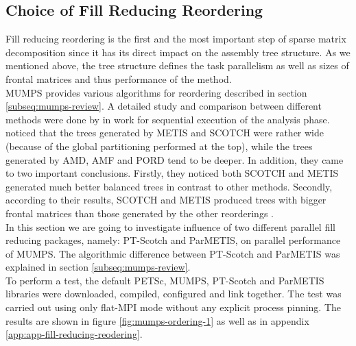 \subsection{Choice of Fill Reducing Reordering}
\label{subseq:fill-in-reordering}

Fill reducing reordering is the first and the most important step of sparse matrix decomposition since it has its direct impact on the assembly tree structure. As we mentioned above, the tree structure defines the task parallelism as well as sizes of frontal matrices and thus performance of the method.\\


MUMPS provides various algorithms for reordering described in section \ref{subseq:mumps-review}. A detailed study and comparison between different methods were done by \citeauthor{guermouche2003memory} in work \cite{guermouche2003memory} for sequential execution of the analysis phase. \citeauthor{guermouche2003memory} noticed that the trees generated by METIS and SCOTCH were rather wide (because of the global partitioning performed at the top), while the trees generated by AMD, AMF and PORD tend to be deeper. In addition, they came to two important conclusions. Firstly, they noticed both SCOTCH and METIS generated much better balanced trees in contrast to other methods. Secondly, according to their results, SCOTCH and METIS produced trees with bigger frontal matrices than those generated by the other reorderings \cite{guermouche2003memory}.\\


In this section we are going to investigate influence of two different parallel fill reducing packages, namely: PT-Scotch and ParMETIS, on parallel performance of MUMPS. The algorithmic difference between PT-Scotch and ParMETIS was explained in section \ref{subseq:mumps-review}.\\


To perform a test, the default PETSc, MUMPS, PT-Scotch and ParMETIS libraries were downloaded, compiled, configured and link together. The test was carried out using only flat-MPI mode without any explicit process pinning. The results are shown in figure \ref{fig:mumps-ordering-1} as well as in appendix \ref{app:app-fill-reducing-reodering}.\\


